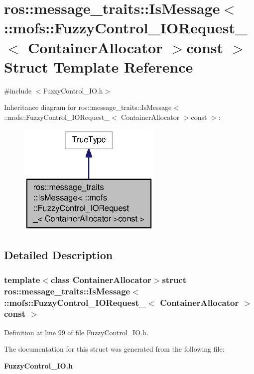 \section{ros\-:\-:message\-\_\-traits\-:\-:Is\-Message$<$ \-:\-:mofs\-:\-:Fuzzy\-Control\-\_\-\-I\-O\-Request\-\_\-$<$ Container\-Allocator $>$const $>$ Struct Template Reference}
\label{structros_1_1message__traits_1_1IsMessage_3_01_1_1mofs_1_1FuzzyControl__IORequest___3_01ContainerAllocator_01_4const_01_01_4}


{\ttfamily \#include $<$Fuzzy\-Control\-\_\-\-I\-O.\-h$>$}



Inheritance diagram for ros\-:\-:message\-\_\-traits\-:\-:Is\-Message$<$ \-:\-:mofs\-:\-:Fuzzy\-Control\-\_\-\-I\-O\-Request\-\_\-$<$ Container\-Allocator $>$const $>$\-:\nopagebreak
\begin{figure}[H]
\begin{center}
\leavevmode
\includegraphics[width=196pt]{structros_1_1message__traits_1_1IsMessage_3_01_1_1mofs_1_1FuzzyControl__IORequest___3_01Containec24dc931b5d99c5d10052a522a7640b1}
\end{center}
\end{figure}


\subsection{Detailed Description}
\subsubsection*{template$<$class Container\-Allocator$>$struct ros\-::message\-\_\-traits\-::\-Is\-Message$<$ \-::mofs\-::\-Fuzzy\-Control\-\_\-\-I\-O\-Request\-\_\-$<$ Container\-Allocator $>$const  $>$}



Definition at line 99 of file Fuzzy\-Control\-\_\-\-I\-O.\-h.



The documentation for this struct was generated from the following file\-:\begin{DoxyCompactItemize}
\item 
{\bf Fuzzy\-Control\-\_\-\-I\-O.\-h}\end{DoxyCompactItemize}
